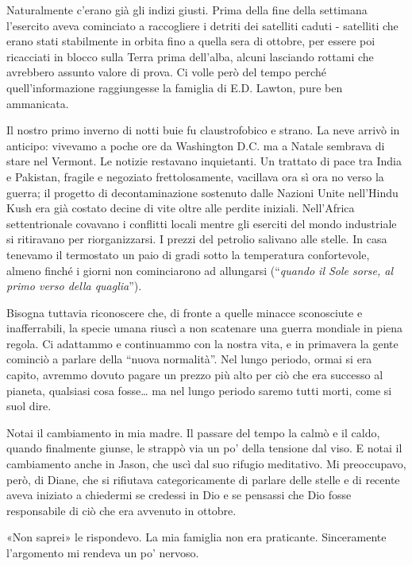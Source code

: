 Naturalmente c'erano già gli indizi giusti. Prima della fine della
settimana l'esercito aveva cominciato a raccogliere i detriti dei
satelliti caduti - satelliti che erano stati stabilmente in orbita fino
a quella sera di ottobre, per essere poi ricacciati in blocco sulla
Terra prima dell'alba, alcuni lasciando rottami che avrebbero assunto
valore di prova. Ci volle però del tempo perché quell'informazione
raggiungesse la famiglia di E.D. Lawton, pure ben ammanicata.

\separatorefiori

Il nostro primo inverno di notti buie fu claustrofobico e strano. La
neve arrivò in anticipo: vivevamo a poche ore da Washington D.C. ma a
Natale sembrava di stare nel Vermont. Le notizie restavano inquietanti.
Un trattato di pace tra India e Pakistan, fragile e negoziato
frettolosamente, vacillava ora sì ora no verso la guerra; il progetto di
decontaminazione sostenuto dalle Nazioni Unite nell'Hindu Kush era già
costato decine di vite oltre alle perdite iniziali. Nell'Africa
settentrionale covavano i conflitti locali mentre gli eserciti del mondo
industriale si ritiravano per riorganizzarsi. I prezzi del petrolio
salivano alle stelle. In casa tenevamo il termostato un paio di gradi
sotto la temperatura confortevole, almeno finché i giorni non
cominciarono ad allungarsi (``\emph{quando il Sole sorse, al primo verso
	della quaglia}'').

Bisogna tuttavia riconoscere che, di fronte a quelle minacce sconosciute
e inafferrabili, la specie umana riuscì a non scatenare una guerra
mondiale in piena regola. Ci adattammo e continuammo con la nostra vita,
e in primavera la gente cominciò a parlare della ``nuova normalità''.
Nel lungo periodo, ormai si era capito, avremmo dovuto pagare un prezzo
più alto per ciò che era successo al pianeta, qualsiasi cosa
fosse\ldots{} ma nel lungo periodo saremo tutti morti, come si suol
dire.

Notai il cambiamento in mia madre. Il passare del tempo la calmò e il
caldo, quando finalmente giunse, le strappò via un po' della tensione
dal viso. E notai il cambiamento anche in Jason, che uscì dal suo
rifugio meditativo. Mi preoccupavo, però, di Diane, che si rifiutava
categoricamente di parlare delle stelle e di recente aveva iniziato a
chiedermi se credessi in Dio e se pensassi che Dio fosse responsabile di
ciò che era avvenuto in ottobre.

«Non saprei» le rispondevo. La mia famiglia non era praticante.
Sinceramente l'argomento mi rendeva un po' nervoso.

